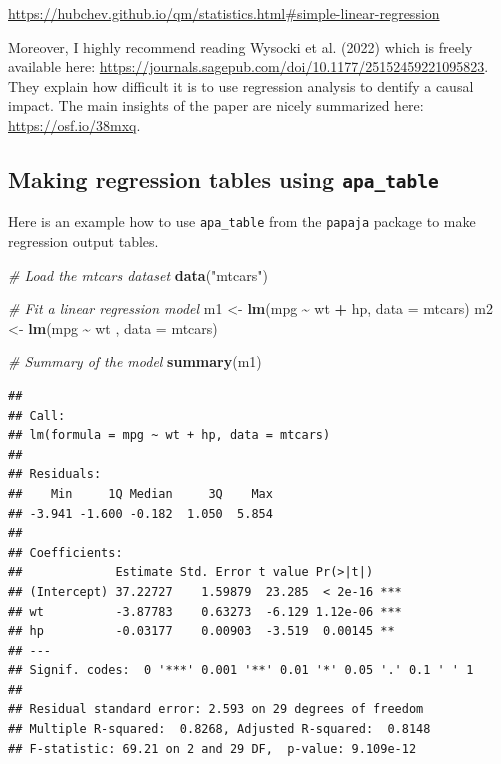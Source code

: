 \documentclass[
  doc]{apa6}
\newenvironment{Shaded}{\begin{snugshade}}{\end{snugshade}}
\newcommand{\AttributeTok}[1]{\textcolor[rgb]{0.13,0.29,0.53}{#1}}
\newcommand{\CommentTok}[1]{\textcolor[rgb]{0.56,0.35,0.01}{\textit{#1}}}
\newcommand{\FunctionTok}[1]{\textcolor[rgb]{0.13,0.29,0.53}{\textbf{#1}}}
\newcommand{\NormalTok}[1]{#1}
\newcommand{\OtherTok}[1]{\textcolor[rgb]{0.56,0.35,0.01}{#1}}
\newcommand{\SpecialCharTok}[1]{\textcolor[rgb]{0.81,0.36,0.00}{\textbf{#1}}}
\newcommand{\StringTok}[1]{\textcolor[rgb]{0.31,0.60,0.02}{#1}}
\begin{document}
\url{https://hubchev.github.io/qm/statistics.html\#simple-linear-regression}

Moreover, I highly recommend reading Wysocki et al. (2022) which is freely available here: \url{https://journals.sagepub.com/doi/10.1177/25152459221095823}. They explain how difficult it is to use regression analysis to dentify a causal impact. The main insights of the paper are nicely summarized here: \url{https://osf.io/38mxq}.

\subsection{\texorpdfstring{Making regression tables using \texttt{apa\_table}}{Making regression tables using apa\_table}}\label{making-regression-tables-using-apa_table}

Here is an example how to use \texttt{apa\_table} from the \texttt{papaja} package to make regression output tables.

\begin{Shaded}
\begin{Highlighting}[]
\CommentTok{\# Load the mtcars dataset}
\FunctionTok{data}\NormalTok{(}\StringTok{"mtcars"}\NormalTok{)}

\CommentTok{\# Fit a linear regression model}
\NormalTok{m1 }\OtherTok{\textless{}{-}} \FunctionTok{lm}\NormalTok{(mpg }\SpecialCharTok{\textasciitilde{}}\NormalTok{ wt }\SpecialCharTok{+}\NormalTok{ hp, }\AttributeTok{data =}\NormalTok{ mtcars)}
\NormalTok{m2 }\OtherTok{\textless{}{-}} \FunctionTok{lm}\NormalTok{(mpg }\SpecialCharTok{\textasciitilde{}}\NormalTok{ wt , }\AttributeTok{data =}\NormalTok{ mtcars)}

\CommentTok{\# Summary of the model}
\FunctionTok{summary}\NormalTok{(m1)}
\end{Highlighting}
\end{Shaded}

\begin{verbatim}
## 
## Call:
## lm(formula = mpg ~ wt + hp, data = mtcars)
## 
## Residuals:
##    Min     1Q Median     3Q    Max 
## -3.941 -1.600 -0.182  1.050  5.854 
## 
## Coefficients:
##             Estimate Std. Error t value Pr(>|t|)    
## (Intercept) 37.22727    1.59879  23.285  < 2e-16 ***
## wt          -3.87783    0.63273  -6.129 1.12e-06 ***
## hp          -0.03177    0.00903  -3.519  0.00145 ** 
## ---
## Signif. codes:  0 '***' 0.001 '**' 0.01 '*' 0.05 '.' 0.1 ' ' 1
## 
## Residual standard error: 2.593 on 29 degrees of freedom
## Multiple R-squared:  0.8268, Adjusted R-squared:  0.8148 
## F-statistic: 69.21 on 2 and 29 DF,  p-value: 9.109e-12
\end{verbatim}
\end{document}
